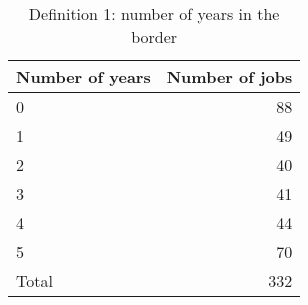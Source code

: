 \begin{table}[h!]
	\caption{Definition 1: number of years in the border}
	\centering
	\begin{tabular}{lr}
	\toprule
Number of years & Number of jobs \\
\midrule
0&88 \\
1&49 \\
2&40 \\
3&41 \\
4&44 \\
5&70 \\
Total&332 \\
\bottomrule
\end{tabular}
\end{table}
